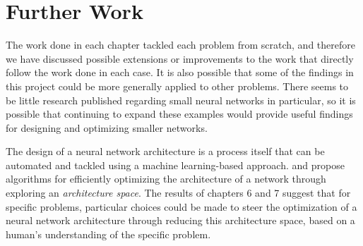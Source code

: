 \documentclass{somasmsc}
\begin{document}
\section{Further Work}

The work done in each chapter tackled each problem from scratch, and therefore we have discussed possible extensions or improvements to the work that directly follow the work done in each case. It is also possible that some of the findings in this project could be more generally applied to other problems. There seems to be little research published regarding small neural networks in particular, so it is possible that continuing to expand these examples would provide useful findings for designing and optimizing smaller networks.

The design of a neural network architecture is a process itself that can be automated and tackled using a machine learning-based approach. \citet{luo2018neural} and \citet{pham2018efficient} propose algorithms for efficiently optimizing the architecture of a network through exploring an \textit{architecture space}. The results of chapters 6 and 7 suggest that for specific problems, particular choices could be made to steer the optimization of a neural network architecture through reducing this architecture space, based on a human's understanding of the specific problem.






\backmatter
\renewcommand{\bibname}{References}



\end{document}
